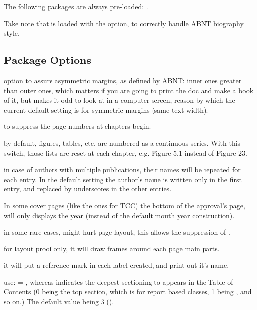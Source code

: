 \documentclass[article,nogeometry,english,tocdepth=3,secdepth=3]{ufrgscca} %
\begin{document}
The following packages are always pre-loaded: .

Take note that  is loaded with the \textbf{} option, to correctly handle ABNT biography style.

\subsection{Package Options}


\begin{describelist}{option}
	 {to assure asymmetric margins, as defined by ABNT: inner ones greater than outer ones, which matters if you are going to print the doc and make a book of it, but makes it odd to look at in a computer screen, reason by which the current default setting is for symmetric margins (same text width).}

 	 { to suppress the page numbers at chapters begin.}

	 { by default, figures, tables, etc. are numbered as a continuous series. With this switch, those lists are reset at each chapter, e.g. Figure 5.1 instead of Figure 23.}

	 { in case of authors with multiple publications, their names will be repeated for each entry. In the default setting the author's name is written only in the first entry, and replaced by underscores in the other entries.}

     { In some cover pages (like the ones for TCC) the bottom of the approval's page, will only displays the year (instead of the default mouth year construction).}
  
	 { in some rare cases,  might hurt page layout, this allows the suppression of .}

	 { for layout proof only, it will draw frames around each page main parts.}

	 { it will put a reference mark in each label created, and print out it's name.}

	 { use:  = , whereas  indicates the deepest sectioning to appears in the Table of Contents (0 being the top section, which is \tsmacro{\chapter}{} for report based classes, 1 being \tsmacro{\section}{}, and so on.) The default value being 3 (\tsmacro{\subsubsection}{}).}


\end{describelist}
\end{document}
